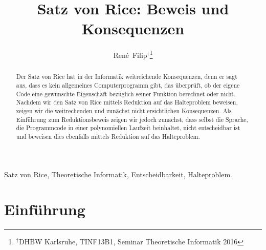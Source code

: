 \documentclass[journal]{IEEEtran}
\begin{document}
\newtheorem{definition}{Definition}
\newtheorem{theorem}[definition]{Satz}
\newtheorem{corollar}[definition]{Korollar}
\newtheorem{example}[definition]{Beispiel}

\renewcommand{\proofname}{Beweis}

\title{Satz von Rice: Beweis und Konsequenzen}


\author{René~Filip$^{\dag}$\thanks{$^{\dag}$DHBW Karlsruhe, TINF13B1, Seminar Theoretische Informatik 2016}}


\maketitle


\begin{abstract}
Der Satz von Rice hat in der Informatik weitreichende Konsequenzen, denn er sagt aus, dass es kein allgemeines Computerprogramm gibt, das überprüft, ob der eigene Code eine gewünschte Eigenschaft bezüglich seiner Funktion berechnet oder nicht. Nachdem wir den Satz von Rice mittels Reduktion auf das Halteproblem beweisen, zeigen wir die weitrechenden und zunächst nicht ersichtlichen Konsequenzen. Als Einführung zum Reduktionsbeweis zeigen wir jedoch zunächst, dass selbst die Sprache, die Programmcode in einer polynomiellen Laufzeit beinhaltet, nicht entscheidbar ist und beweisen dies ebenfalls mittels Reduktion auf das Halteproblem.
\end{abstract}


\begin{IEEEkeywords}
  Satz von Rice, Theoretische Informatik, Entscheidbarkeit, Halteproblem.
\end{IEEEkeywords}






\section{Einführung}
\end{document}

